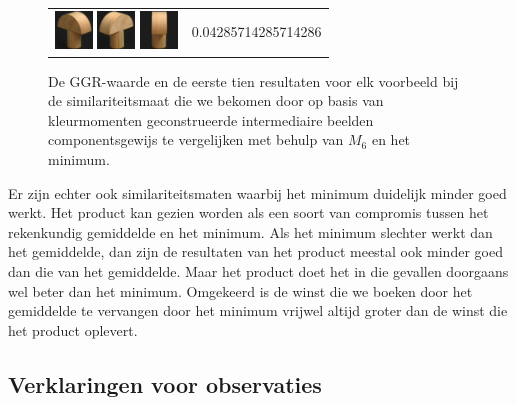 {\begin{figure}[p]
\begin{tabular}{m{11cm} | m{3cm} |}
\includegraphics[width=1cm]{coil/beeld-4.eps}
\includegraphics[width=1cm]{coil/beeld-3.eps}
\includegraphics[width=1cm]{coil/beeld-5.eps}
& {\scriptsize 0.04285714285714286}
\\
\end{tabular}
\vspace{5pt}
\caption{\label{fig:results_beste_moments_comps_pixelgeb}De GGR-waarde en de eerste tien 
resultaten voor elk voorbeeld bij de similariteitsmaat die we 
bekomen door op basis van kleurmomenten geconstrueerde intermediaire beelden componentsgewijs 
te vergelijken met behulp van $M_{6}$ en het minimum.}
\end{figure}

\clearpage}

Er zijn echter ook similariteitsmaten waarbij het minimum
duidelijk minder goed werkt. Het product kan gezien worden als een soort van compromis
tussen het rekenkundig gemiddelde en het minimum. Als het minimum slechter werkt dan het gemiddelde,
dan zijn de resultaten van het product meestal ook minder goed dan die van het gemiddelde.
Maar het product doet het in die gevallen doorgaans wel beter dan het minimum. Omgekeerd
is de winst die we boeken door het gemiddelde te vervangen door het minimum vrijwel altijd
groter dan de winst die het product oplevert.

\subsection{Verklaringen voor observaties}

